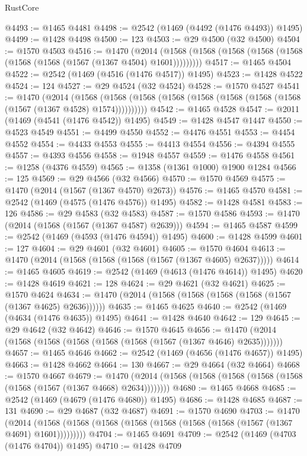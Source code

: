 \begin{lexlean}{RustCore}
\begin{coremodule}
{\begin{coremodule}
{{{{{{{{{{{{{{{{{{{{{{{{{{{{{{{{{{{{{{{{{{{{{{{@4493 := @1465 @4481
@4498 := @2542 (@1469 (@4492 (@1476 @4493)) @1495)
@4499 := @1428 @4498
@4500 := 123
@4503 := @29 @4500 (@32 @4500)
@4504 := @1570 @4503
@4516 := @1470
    (@2014 (@1568 (@1568 (@1568 (@1568 (@1568 (@1568 (@1568 (@1567 (@1367 @4504) @1601)))))))))
@4517 := @1465 @4504
@4522 := @2542 (@1469 (@4516 (@1476 @4517)) @1495)
@4523 := @1428 @4522
@4524 := 124
@4527 := @29 @4524 (@32 @4524)
@4528 := @1570 @4527
@4541 := @1470
    (@2014
      (@1568 (@1568 (@1568 (@1568 (@1568 (@1568 (@1568 (@1568 (@1567 (@1367 @4528) @1574))))))))))
@4542 := @1465 @4528
@4547 := @2011 (@1469 (@4541 (@1476 @4542)) @1495)
@4549 := @1428 @4547 @1447
@4550 := @4523 @4549
@4551 := @4499 @4550
@4552 := @4476 @4551
@4553 := @4454 @4552
@4554 := @4433 @4553
@4555 := @4413 @4554
@4556 := @4394 @4555
@4557 := @4393 @4556
@4558 := @1948 @4557
@4559 := @1476 @4558
@4561 := @1258 (@4376 @4559)
@4565 := @1358 (@1361 @1000) @1900 @1284
@4566 := 125
@4569 := @29 @4566 (@32 @4566)
@4570 := @1570 @4569
@4575 := @1470 (@2014 (@1567 (@1367 @4570) @2673))
@4576 := @1465 @4570
@4581 := @2542 (@1469 (@4575 (@1476 @4576)) @1495)
@4582 := @1428 @4581
@4583 := 126
@4586 := @29 @4583 (@32 @4583)
@4587 := @1570 @4586
@4593 := @1470 (@2014 (@1568 (@1567 (@1367 @4587) @2639)))
@4594 := @1465 @4587
@4599 := @2542 (@1469 (@4593 (@1476 @4594)) @1495)
@4600 := @1428 @4599
@4601 := 127
@4604 := @29 @4601 (@32 @4601)
@4605 := @1570 @4604
@4613 := @1470 (@2014 (@1568 (@1568 (@1568 (@1567 (@1367 @4605) @2637)))))
@4614 := @1465 @4605
@4619 := @2542 (@1469 (@4613 (@1476 @4614)) @1495)
@4620 := @1428 @4619
@4621 := 128
@4624 := @29 @4621 (@32 @4621)
@4625 := @1570 @4624
@4634 := @1470 (@2014 (@1568 (@1568 (@1568 (@1568 (@1567 (@1367 @4625) @2636))))))
@4635 := @1465 @4625
@4640 := @2542 (@1469 (@4634 (@1476 @4635)) @1495)
@4641 := @1428 @4640
@4642 := 129
@4645 := @29 @4642 (@32 @4642)
@4646 := @1570 @4645
@4656 := @1470 (@2014 (@1568 (@1568 (@1568 (@1568 (@1568 (@1567 (@1367 @4646) @2635)))))))
@4657 := @1465 @4646
@4662 := @2542 (@1469 (@4656 (@1476 @4657)) @1495)
@4663 := @1428 @4662
@4664 := 130
@4667 := @29 @4664 (@32 @4664)
@4668 := @1570 @4667
@4679 := @1470 (@2014 (@1568 (@1568 (@1568 (@1568 (@1568 (@1568 (@1567 (@1367 @4668) @2634))))))))
@4680 := @1465 @4668
@4685 := @2542 (@1469 (@4679 (@1476 @4680)) @1495)
@4686 := @1428 @4685
@4687 := 131
@4690 := @29 @4687 (@32 @4687)
@4691 := @1570 @4690
@4703 := @1470
    (@2014 (@1568 (@1568 (@1568 (@1568 (@1568 (@1568 (@1568 (@1567 (@1367 @4691) @1601)))))))))
@4704 := @1465 @4691
@4709 := @2542 (@1469 (@4703 (@1476 @4704)) @1495)
@4710 := @1428 @4709
}}}}}}}}}}}}}}}}}}}}}}}}}}}}}}}}}}}}}}}}}}}}}}}
\end{coremodule}}
\end{coremodule}
\end{lexlean}
